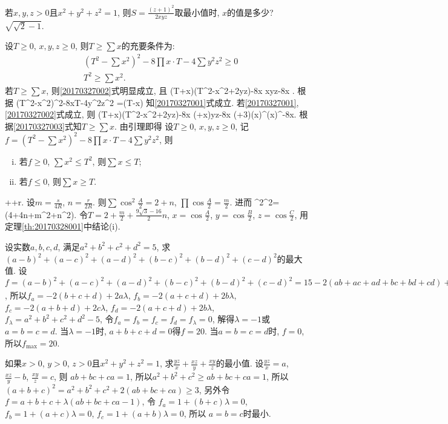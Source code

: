 \bq{}{}
若$x,y,z>0$且$x^2+y^2+z^2=1$, 则$S=\frac{(z+1)^2}{2xyz}$取最小值时, $x$的值是多少?
\eq
\ba
$\sqrt{\sqrt{2}-1}$.
\ea

\bl{}{}
设$T\ge0$, $x, y, z\ge0$, 则$T\ge\sum x$的充要条件为:
\begin{align}
 & (T^2-\sum x^2)^2-8\prod x\cdot T-4\sum y^2z^2\ge0\label{20170327001}\\
 & T^2\ge\sum x^2.\label{20170327002}
\end{align}
\el
\ba
若$T\ge\sum x$, 则\ref{20170327002}式明显成立, 且
\bee
(T+\sum x)(T^2-\sum x^2+2\sum yz)-8\prod x
\sum x\sum yz-8\prod x
.
\eee
根据
\be
(T^2-\sum x^2)^2-8\prod x\cdot T-4\sum y^2z^2
=(T-\sum x)\label{20170327003}
\ee
知\ref{20170327001}式成立. 若\ref{20170327001}, \ref{20170327002}式成立, 则
\bee
(T+\sum x)(T^2-\sum x^2+2\sum yz)-8\prod x
\ge (+\sum x)\sum yz-8\prod x
\ge (+3)(\prod x)^{}(\prod x)^{}-8\prod x.
\eee
根据\ref{20170327003}式知$T\ge\sum x$.
\ea
由引理即得
设$T\ge0$, $x,y,z\ge0$, 记$f=(T^2-\sum x^2)^2-8\prod x\cdot T-4\sum y^2z^2$, 则
\begin{enumerate}[(i)]
 \item 若$f\ge0$, $\sum x^2\le T^2$, 则$\sum x\le T$;
 \item 若$f\le 0$, 则$\sum x\ge T$.
\end{enumerate}
\et

\bq{}{}
\bee
\sum\cos{}++r.
\eee
\eq
\ba
设$m=\frac{s}{4R}$, $n=\frac{r}{2R}$. 则$\sum\cos^2\frac{A}{2}=2+n$, $\prod\cos\frac{A}{2}=\frac{m}{2}$. 进而
\bee
\sum\cos^2\cos^2=(4+4n+m^2+n^2).
\eee
令$T=2+\frac{m}{2}+\frac{9\sqrt{3}-16}{2}n$, $x=\cos\frac{A}{2}$, $y=\cos\frac{B}{2}$, $z=\cos\frac{C}{2}$,
用定理\ref{th:20170328001}中结论(i).
\ea

\bq{}{}
设实数$a,b,c,d$, 满足$a^2+b^2+c^2+d^2=5$, 求$(a-b)^2+(a-c)^2+(a-d)^2+(b-c)^2+(b-d)^2+(c-d)^2$的最大值.
\eq
\ba
设$f=(a-b)^2+(a-c)^2+(a-d)^2+(b-c)^2+(b-d)^2+(c-d)^2=15-2(ab+ac+ad+bc+bd+cd)+\lambda(a^2+b^2+c^2+d^2-5)$,
所以$f_a=-2(b+c+d)+2a\lambda$, $f_b=-2(a+c+d)+2b\lambda$, $f_c=-2(a+b+d)+2c\lambda$, $f_d=-2(a+c+d)+2b\lambda$,
$f_{\lambda}=a^2+b^2+c^2+d^2-5$, 令$f_a=f_b=f_c=f_d=f_{\lambda}=0$, 解得$\lambda=-1$或$a=b=c=d$.
当$\lambda=-1$时, $a+b+c+d=0$得$f=20$.
当$a=b=c=d$时, $f=0$, 所以$f_{\max}=20$.
\ea

\bq{}{}
如果$x>0$, $y>0$, $z>0$且$x^2+y^2+z^2=1$, 求$\frac{yz}{x}+\frac{xz}{y}+\frac{xy}{z}$的最小值.
\eq
\ba
设$\frac{yz}{x}=a$, $\frac{xz}{y}-b$, $\frac{xy}{z}=c$, 则
$ab+bc+ca=1$, 所以$a^2+b^2+c^2\ge ab+bc+ca=1$, 所以$(a+b+c)^2=a^2+b^2+c^2+2(ab+bc+ca)\ge3$,
另外令$f=a+b+c+\lambda(ab+bc+ca-1)$, 令
$f_a=1+(b+c)\lambda=0$, $f_b=1+(a+c)\lambda=0$, $f_c=1+(a+b)\lambda=0$, 所以
$a=b=c$时最小.
\ea

